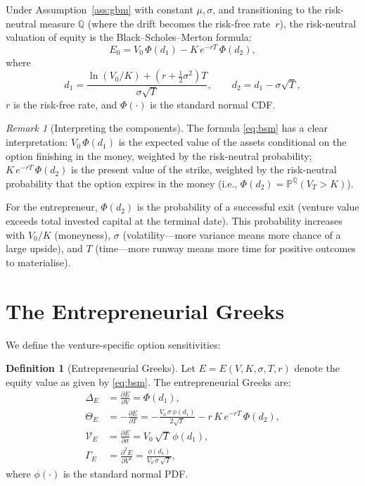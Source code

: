 \documentclass[12pt,a4paper,oneside]{book}
\theoremstyle{definition}
\newtheorem{definition}[theorem]{Definition}
\theoremstyle{remark}
\newtheorem{remark}[theorem]{Remark}
\newcommand{\Prob}{\mathbb{P}}
\begin{document}
Under Assumption~\ref{ass:gbm} with constant $\mu,\sigma$, and transitioning to the
risk-neutral measure $\mathbb{Q}$ (where the drift becomes the risk-free rate~$r$), the
risk-neutral valuation of equity is the Black--Scholes--Merton formula:
\begin{equation}\label{eq:bsm}
  E_0 = V_0\,\Phi(d_1) - K\,e^{-rT}\,\Phi(d_2),
\end{equation}
where
\begin{equation}\label{eq:d1d2}
  d_1 = \frac{\ln(V_0/K) + (r + \tfrac{1}{2}\sigma^2)T}{\sigma\sqrt{T}},
  \qquad
  d_2 = d_1 - \sigma\sqrt{T},
\end{equation}
$r$ is the risk-free rate, and $\Phi(\cdot)$ is the standard normal CDF.

\begin{remark}[Interpreting the components]
The formula \eqref{eq:bsm} has a clear interpretation: $V_0\,\Phi(d_1)$ is the
expected value of the assets conditional on the option finishing in the money,
weighted by the risk-neutral probability; $K\,e^{-rT}\,\Phi(d_2)$ is the present
value of the strike, weighted by the risk-neutral probability that the option
expires in the money (i.e., $\Phi(d_2) = \Prob^{\mathbb{Q}}(V_T > K)$).

For the entrepreneur, $\Phi(d_2)$ is the probability of a successful exit (venture
value exceeds total invested capital at the terminal date). This probability
increases with $V_0/K$ (moneyness), $\sigma$ (volatility---more variance means more
chance of a large upside), and $T$ (time---more runway means more time for positive
outcomes to materialise).
\end{remark}

\section{The Entrepreneurial Greeks}

We define the venture-specific option sensitivities:

\begin{definition}[Entrepreneurial Greeks]\label{def:greeks}
Let $E = E(V, K, \sigma, T, r)$ denote the equity value as given by
\eqref{eq:bsm}. The entrepreneurial Greeks are:
\begin{align}
  \Delta_E &= \frac{\partial E}{\partial V} = \Phi(d_1),
    \label{eq:delta} \\[6pt]
  \Theta_E &= -\frac{\partial E}{\partial T}
    = -\frac{V_0\,\sigma\,\phi(d_1)}{2\sqrt{T}}
      - r\,K\,e^{-rT}\,\Phi(d_2),
    \label{eq:theta} \\[6pt]
  \mathcal{V}_E &= \frac{\partial E}{\partial \sigma}
    = V_0\,\sqrt{T}\,\phi(d_1),
    \label{eq:vega} \\[6pt]
  \Gamma_E &= \frac{\partial^2 E}{\partial V^2}
    = \frac{\phi(d_1)}{V_0\,\sigma\,\sqrt{T}},
    \label{eq:gamma}
\end{align}
where $\phi(\cdot)$ is the standard normal PDF.
\end{definition}
\end{document}
